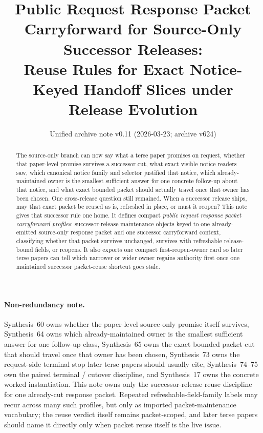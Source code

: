 \documentclass[11pt]{article}
\title{Public Request Response Packet Carryforward for Source-Only Successor Releases:\\[0.5ex]
\large Reuse Rules for Exact Notice-Keyed Handoff Slices under Release Evolution}
\author{}
\date{Unified archive note v0.11 (2026-03-23; archive v624)}
\begin{document}
\maketitle

\begin{abstract}
The source-only branch can now say what a terse paper promises on request, whether that paper-level promise survives a successor cut, what exact visible notice readers saw, which canonical notice family and selector justified that notice, which already-maintained owner is the smallest sufficient answer for one concrete follow-up about that notice, and what exact bounded packet should actually travel once that owner has been chosen.
One cross-release question still remained.
When a successor release ships, may that exact packet be reused as is, refreshed in place, or must it reopen?
This note gives that successor rule one home.
It defines compact \emph{public request response packet carryforward profiles}: successor-release maintenance objects keyed to one already-emitted source-only response packet and one successor carryforward context, classifying whether that packet survives unchanged, survives with refreshable release-bound fields, or reopens.
It also exports one compact first-reopen-owner card so later terse papers can tell which narrower or wider owner regains authority first once one maintained successor packet-reuse shortcut goes stale.
\end{abstract}

\paragraph{Non-redundancy note.}
Synthesis~60 owns whether the paper-level source-only promise itself survives, Synthesis~64 owns which already-maintained owner is the smallest sufficient answer for one follow-up class, Synthesis~65 owns the exact bounded packet cut that should travel once that owner has been chosen, Synthesis~73 owns the request-side terminal stop later terse papers should usually cite, Synthesis~74--75 own the paired terminal / cutover discipline, and Synthesis~17 owns the concrete worked instantiation.\cite{series:publicrequestcarryforward,series:publicrequestresponsemenus,series:publicrequestresponsepackets,series:publicrequestresponsepacketrefreshresponsepacketclosureverdicts,series:pairedterminalcitationdiscipline,series:pairedterminalcutoverrule,series:workedexample}
This note owns only the successor-release reuse discipline for one already-cut response packet. Repeated refreshable-field-family labels may recur across many such profiles, but only as imported packet-maintenance vocabulary; the reuse verdict itself remains packet-scoped, and later terse papers should name it directly only when packet reuse itself is the live issue.
\end{document}
